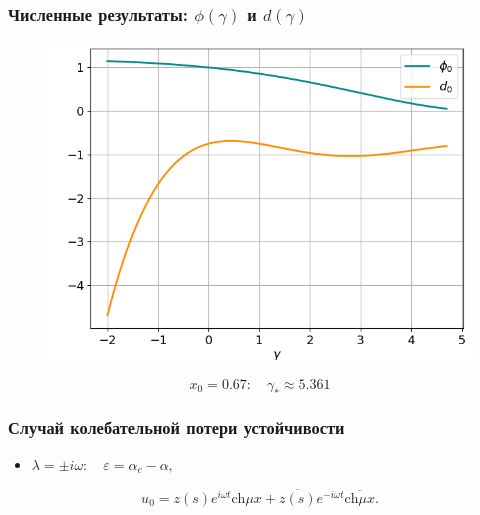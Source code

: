 \documentclass[fullscreen=true, unicode, bookmarks=false]{beamer}
\begin{document}
\begin{frame}
\frametitle{ Численные результаты: $ \phi(\gamma) $ и $ d(\gamma) $ }

\begin{figure} 
\includegraphics[scale=0.55]{divergent_phi0d0_23.png}  
\end{figure}

$$ x_0 = 0.67: \quad \gamma_* \approx 5.361 $$

\end{frame}

\begin{frame}
\frametitle{ Случай колебательной потери устойчивости }

\begin{itemize}
\item { $ \lambda = \pm i \omega: \quad \varepsilon=\alpha_c-\alpha, $
}
\end{itemize}

\bigskip

\begin{equation}
	u_0 = z(s) e^{i \omega t} \mbox{ch} \mu x + \overline{z(s)} e^{-i \omega t} \overline{\mbox{ch} \mu x}.
\end{equation}

\end{frame}
\end{document}
